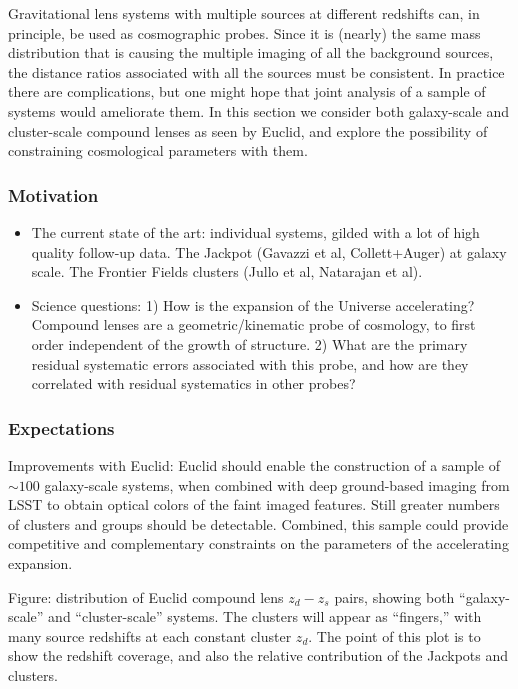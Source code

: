 \documentclass[twocolumn]{svjour3}
\begin{document}
Gravitational lens systems with multiple sources at different redshifts can, in principle, be used as cosmographic probes. Since it is (nearly) the same mass distribution that is causing the multiple imaging of all the background sources, the distance ratios associated with all the sources must be consistent. In practice there are complications, but one might hope that joint analysis of a sample of systems would ameliorate them. In this section we consider both galaxy-scale and cluster-scale compound lenses as seen by Euclid, and explore the possibility of constraining cosmological parameters with them.

\subsubsection{Motivation}

\begin{itemize}
\item The current state of the art: individual systems, gilded with a lot of high quality follow-up data. The Jackpot (Gavazzi et al, Collett+Auger) at galaxy scale. The Frontier Fields clusters (Jullo et al, Natarajan et al).
\item Science questions: 1) How is the expansion of the Universe accelerating? Compound lenses are a geometric/kinematic probe of cosmology, to first order independent of the growth of structure. 2) What are the primary residual systematic errors associated with this probe, and how are they correlated with residual systematics in other probes?
\end{itemize}

\subsubsection{Expectations}

Improvements with Euclid: Euclid should enable the construction of a
sample of $\sim100$ galaxy-scale systems, when combined with deep
ground-based imaging from LSST to obtain optical colors of the faint
imaged features. Still greater numbers of clusters and groups should be
detectable. Combined, this sample could provide competitive and
complementary constraints on the parameters of the accelerating
expansion.

Figure: distribution of Euclid compound lens $z_d - z_s$ pairs, showing
both ``galaxy-scale'' and ``cluster-scale'' systems. The clusters will
appear as ``fingers,'' with many source redshifts at each constant
cluster $z_d$. The point of this plot is to show the redshift coverage,
and also the relative contribution of the Jackpots and clusters.
\end{document}

